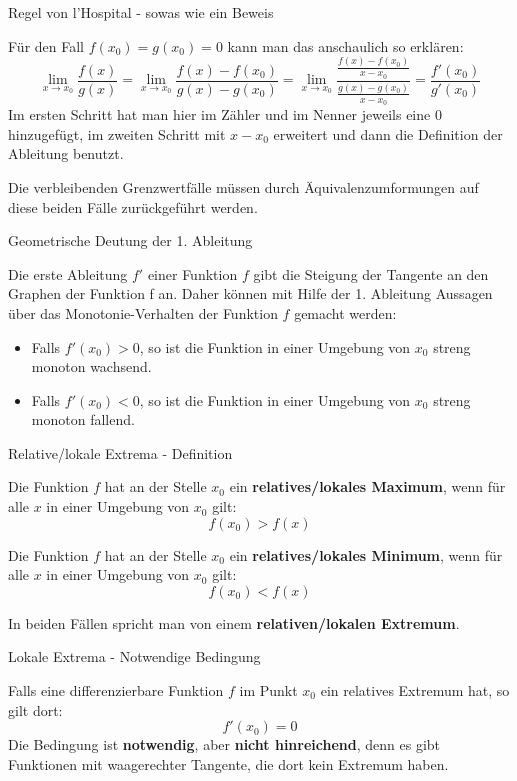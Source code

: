 \begin{frame}{Regel von l'Hospital - sowas wie ein Beweis}
	\begin{bemerkung}
		Für den Fall $f(x_{0})=g(x_{0}) = 0$ kann man das anschaulich so erklären:
		\[
			\lim_{x \to x_{0}} \frac{f(x)}{g(x)} = \lim_{x \to x_{0}} \frac{f(x)-f(x_{0})}{g(x)-g(x_{0})} = \lim_{x \to x_{0}} \frac{\frac{f(x)-f(x_{0})}{x-x_{0}}}{\frac{g(x)-g(x_{0})}{x-x_{0}}} = \frac{f'(x_{0})}{g'(x_{0})}
		\]
		Im ersten Schritt hat man hier im Zähler und im Nenner jeweils eine 0 hinzugefügt, im zweiten Schritt mit $x-x_{0}$ erweitert und dann die Definition der Ableitung benutzt.
		
		Die verbleibenden Grenzwertfälle müssen durch Äquivalenzumformungen auf diese beiden Fälle zurückgeführt werden.
	\end{bemerkung}
\end{frame}

\begin{frame}{Geometrische Deutung der 1. Ableitung}
	\begin{bemerkung}
		Die erste Ableitung $f'$ einer Funktion $f$ gibt die Steigung der Tangente an den Graphen der Funktion f an. Daher können mit Hilfe der 1. Ableitung Aussagen über das Monotonie-Verhalten der Funktion $f$ gemacht werden:
		\begin{itemize}
			\item Falls $f'(x_{0})>0$, so ist die Funktion in einer Umgebung von $x_{0}$ streng monoton wachsend.
			\item Falls $f'(x_{0})<0$, so ist die Funktion in einer Umgebung von $x_{0}$ streng monoton fallend.	
		\end{itemize}  
	\end{bemerkung}
\end{frame}

\begin{frame}{Relative/lokale Extrema - Definition}
	\begin{definition}
		Die Funktion $f$ hat an der Stelle $x_{0}$ ein \textbf{relatives/lokales Maximum}, wenn für alle $x$ in einer Umgebung von $x_{0}$ gilt: 
		\[
		f(x_{0})>f(x)
		\]
		
		Die Funktion $f$ hat an der Stelle $x_{0}$ ein \textbf{relatives/lokales Minimum}, wenn für alle $x$ in einer Umgebung von $x_{0}$ gilt: 
		\[
		f(x_{0})<f(x)
		\]
		
		In beiden Fällen spricht man von einem \textbf{relativen/lokalen Extremum}.
	\end{definition}
\end{frame}
\begin{frame}{Lokale Extrema - Notwendige Bedingung}
	\begin{theorem}[Fermat]
		Falls eine differenzierbare Funktion $f$ im Punkt $x_{0}$ ein relatives Extremum hat, so gilt dort:
		\[
			f'(x_{0}) = 0
		\]
		Die Bedingung ist \textbf{notwendig}, aber \textbf{nicht hinreichend}, denn es gibt Funktionen mit waagerechter Tangente, die dort kein Extremum haben.
	\end{theorem}
\end{frame}

